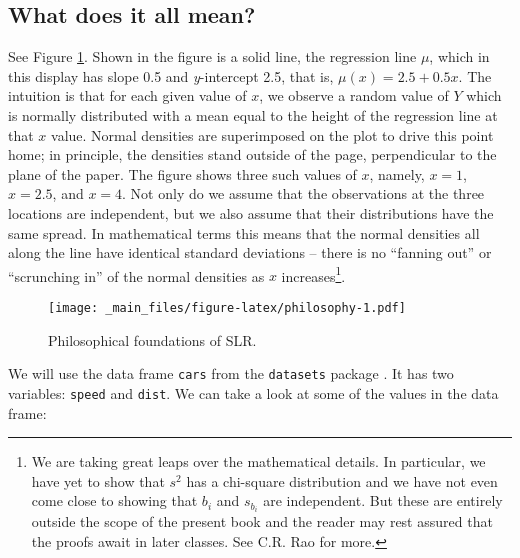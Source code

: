 \documentclass[]{book}
\let\rmarkdownfootnote\footnote%
\def\footnote{\protect\rmarkdownfootnote}
\numberwithin{equation}{chapter}
\numberwithin{figure}{chapter}
\theoremstyle{plain}
\theoremstyle{definition}
\theoremstyle{remark}
\theoremstyle{definition}
\theoremstyle{definition}
\theoremstyle{remark}
\let\BeginKnitrBlock\begin \let\EndKnitrBlock\end
\begin{document}
\subsection{What does it all mean?}\label{what-does-it-all-mean}

See Figure \ref{fig:philosophy}. Shown in the figure is a solid line,
the regression line  \(\mu\), which in this
display has slope 0.5 and \emph{y}-intercept 2.5, that is,
\(\mu(x)=2.5 + 0.5x\). The intuition is that for each given value of
\(x\), we observe a random value of \(Y\) which is normally distributed
with a mean equal to the height of the regression line at that \(x\)
value. Normal densities are superimposed on the plot to drive this point
home; in principle, the densities stand outside of the page,
perpendicular to the plane of the paper. The figure shows three such
values of \(x\), namely, \(x = 1\), \(x = 2.5\), and \(x = 4\). Not only
do we assume that the observations at the three locations are
independent, but we also assume that their distributions have the same
spread. In mathematical terms this means that the normal densities all
along the line have identical standard deviations -- there is no
``fanning out'' or ``scrunching in'' of the normal densities as \(x\)
increases\footnote{We are taking great leaps over the mathematical
  details. In particular, we have yet to show that \(s^{2}\) has a
  chi-square distribution and we have not even come close to showing
  that \(b_{i}\) and \(s_{b_{i}}\) are independent. But these are
  entirely outside the scope of the present book and the reader may rest
  assured that the proofs await in later classes. See C.R. Rao for more.}.

\begin{figure}[htbp]
\centering
\texttt{[image: \_main\_files/figure-latex/philosophy-1.pdf]}
\caption{\label{fig:philosophy}\small Philosophical foundations of SLR.}
\end{figure}



\bigskip

\BeginKnitrBlock{example}[Speed and stopping distance of cars]
\protect\hypertarget{ex:unnamed-chunk-242}{}{\label{ex:unnamed-chunk-242}
\iffalse (Speed and stopping distance of cars) \fi }We will use the data
frame \texttt{cars}  from the \texttt{datasets} package
\autocite{datasets}. It has two variables: \texttt{speed} and
\texttt{dist}. We can take a look at some of the values in the data
frame:
\EndKnitrBlock{example}
\end{document}
